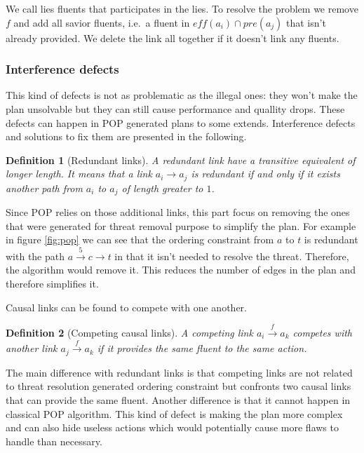 \documentclass[]{article}
\newtheorem{definition}{Definition}
\begin{document}
We call lies fluents that participates in the lies. To resolve the
problem we remove \(f\) and add all savior fluents, i.e.~a fluent in
\(eff(a_i) \cap pre(a_j)\) that isn't already provided. We delete the
link all together if it doesn't link any fluents.

\subsubsection{Interference defects}\label{interference-defects}

This kind of defects is not as problematic as the illegal ones: they
won't make the plan unsolvable but they can still cause performance and
quallity drops. These defects can happen in POP generated plans to some
extends. Interference defects and solutions to fix them are presented in
the following.

\begin{definition}[Redundant links]

A redundant link have a transitive equivalent of longer length. It means
that a link \(a_i \to a_j\) is redundant if and only if it exists
another path from \(a_i\) to \(a_j\) of length greater to \(1\).

\end{definition}

Since POP relies on those additional links, this part focus on removing
the ones that were generated for threat removal purpose to simplify the
plan. For example in figure \ref{fig:pop} we can see that the ordering
constraint from \(a\) to \(t\) is redundant with the path
\(a \xrightarrow{5} c \to t\) in that it isn't needed to resolve the
threat. Therefore, the algorithm would remove it. This reduces the
number of edges in the plan and therefore simplifies it.

Causal links can be found to compete with one another.

\begin{definition}[Competing causal links]

A competing link \(a_i \xrightarrow{f} a_k\) competes with another link
\(a_j \xrightarrow{f} a_k\) if it provides the same fluent to the same
action.

\end{definition}

The main difference with redundant links is that competing links are not
related to threat resolution generated ordering constraint but confronts
two causal links that can provide the same fluent. Another difference is
that it cannot happen in classical POP algorithm. This kind of defect is
making the plan more complex and can also hide useless actions which
would potentially cause more flaws to handle than necessary.
\end{document}
